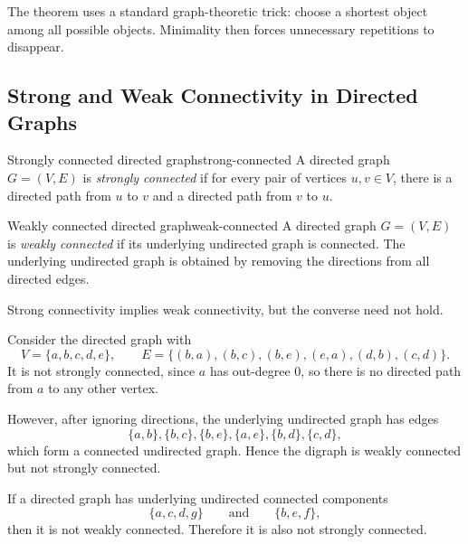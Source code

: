 \begin{extension}[title={Shortest path as a simplification device}]
The theorem uses a standard graph-theoretic trick: choose a shortest object among all possible objects. Minimality then forces unnecessary repetitions to disappear.
\end{extension}

\subsection{Strong and Weak Connectivity in Directed Graphs}

\begin{definition}{Strongly connected directed graph}{strong-connected}
A directed graph \(G=(V,E)\) is \emph{strongly connected} if for every pair of vertices \(u,v\in V\), there is a directed path from \(u\) to \(v\) and a directed path from \(v\) to \(u\).
\end{definition}

\begin{definition}{Weakly connected directed graph}{weak-connected}
A directed graph \(G=(V,E)\) is \emph{weakly connected} if its underlying undirected graph is connected. The underlying undirected graph is obtained by removing the directions from all directed edges.
\end{definition}

Strong connectivity implies weak connectivity, but the converse need not hold.

\begin{examplebox}[title={Tutorial 8, Question 1}]
Consider the directed graph with
\[
V=\{a,b,c,d,e\},
\qquad
E=\{(b,a),(b,c),(b,e),(e,a),(d,b),(c,d)\}.
\]
It is not strongly connected, since \(a\) has out-degree \(0\), so there is no directed path from \(a\) to any other vertex.

However, after ignoring directions, the underlying undirected graph has edges
\[
\{a,b\},\{b,c\},\{b,e\},\{a,e\},\{b,d\},\{c,d\},
\]
which form a connected undirected graph. Hence the digraph is weakly connected but not strongly connected.
\end{examplebox}

\begin{examplebox}[title={A graph that is not weakly connected}]
If a directed graph has underlying undirected connected components
\[
\{a,c,d,g\}
\qquad\text{and}\qquad
\{b,e,f\},
\]
then it is not weakly connected. Therefore it is also not strongly connected.
\end{examplebox}

